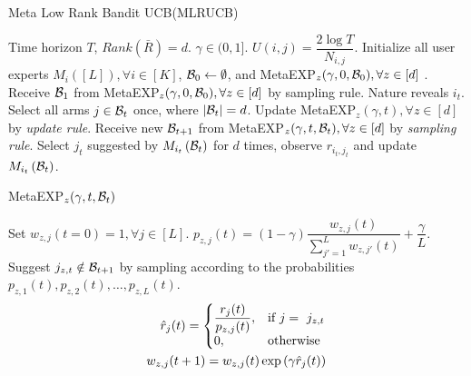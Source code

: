 \begin{algorithm}[!th]
\caption{Meta Low Rank Bandit UCB(MLRUCB)}
\label{alg:mLRB}
\begin{algorithmic}[1]
 Time horizon $T$, $Rank(\bar{R}) = d$.
 $\gamma \in (0,1]$.
 $U(i,j) = \dfrac{2\log T}{N_{i,j}}$.
 Initialize all user experts $M_{i}\left( [L]\right), \forall i\in [K]$,  $\mathcal{B}_0\leftarrow \emptyset$, and MetaEXP$_{z}(\gamma, 0, \mathcal{B}_0),\forall z\in[d]$ .
\State Receive $\mathcal{B}_1$ from MetaEXP$_z(\gamma, 0, \mathcal{B}_0),\forall z\in[d]$ by sampling rule.
\State Nature reveals $i_t$.  
\State Select all arms $j\in \mathcal{B}_t$ once, where $|\mathcal{B}_t| = d$.
\State Update MetaEXP$_{z}(\gamma, t),\forall z\in[d]$ by
\textit{update rule}. 
\State Receive new $\mathcal{B}_{t+1}$ from MetaEXP$_z(\gamma, t, \mathcal{B}_t),\forall z\in[d]$ by \textit{sampling rule}.
\Else {}
\State Select $j_t$ suggested by $M_{i_t}\left( \mathcal{B}_t \right)$ for $d$ times, observe $r_{i_t,j_t}$ and update $M_{i_t}\left( \mathcal{B}_t \right)$. 
\EndIf
\EndFor
\end{algorithmic}
\end{algorithm}


\begin{algorithm}[!th]
\caption{MetaEXP$_{z}(\gamma, t, \mathcal{B}_t)$}
\label{alg:mEXP3}
\begin{algorithmic}[1]
 Set $w_{z,j}(t=0) = 1, \forall j\in [L]$.
{}
\State $p_{z,j}(t) = \left( 1 - \gamma \right)\dfrac{w_{z,j}(t)}{\sum_{j'=1}^{L}w_{z,j'}(t)} + \dfrac{\gamma}{L}$.
\EndFor
\State Suggest $j_{z,t} \notin \mathcal{B}_{t+1}$ by sampling according to the probabilities $p_{z,1}(t), p_{z,2}(t), \ldots, p_{z,L}(t)$.
{} 
\State \begin{align*}
  \hat{r}_j(t)=\left\{
  \begin{array}{@{}ll@{}}
   \dfrac{r_{j}(t)}{p_{z,j}(t)}, & \text{if  } j = \ j_{z,t} \\
    0, & \text{otherwise}
  \end{array}\right.\\
 w_{z,j}(t+1) = w_{z,j}(t)\exp\left( \gamma \hat{r}_j(t)\right)
\end{align*} 
\EndFor
\end{algorithmic}
\end{algorithm}


